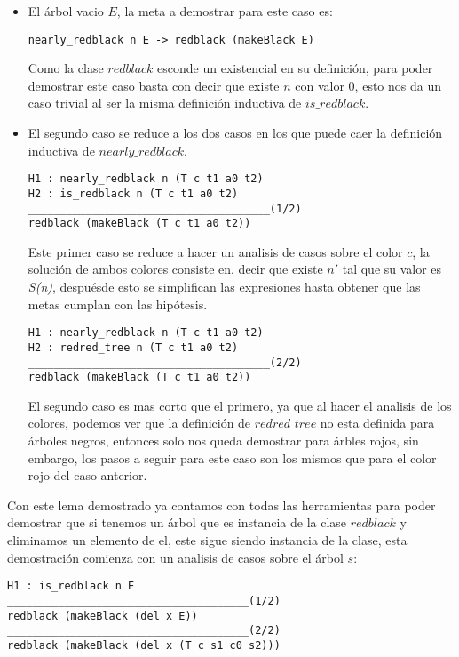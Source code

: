 \begin{itemize}
  \item El \'arbol vacio $E$, la meta a demostrar para este caso es:
\begin{verbatim}
nearly_redblack n E -> redblack (makeBlack E)
\end{verbatim}
        Como la clase $redblack$ esconde un existencial en su definici\'on, para poder demostrar
        este caso basta con decir que existe $n$ con valor 0, esto nos da un caso trivial al ser la
        misma definici\'on inductiva de $is\_redblack$.
  \item El segundo caso se reduce a los dos casos en los que puede caer la definici\'on inductiva
  de $nearly\_redblack$.
\begin{verbatim}
H1 : nearly_redblack n (T c t1 a0 t2)
H2 : is_redblack n (T c t1 a0 t2)
______________________________________(1/2)
redblack (makeBlack (T c t1 a0 t2))
\end{verbatim}
        Este primer caso se reduce a hacer un analisis de casos sobre el color $c$, la soluci\'on
        de ambos colores consiste en, decir que existe $n'$ tal que su valor es \textit{S(n)},
        despuésde esto se simplifican las expresiones hasta obtener que las metas cumplan con las
        hip\'otesis.
\begin{verbatim}
H1 : nearly_redblack n (T c t1 a0 t2)
H2 : redred_tree n (T c t1 a0 t2)
______________________________________(2/2)
redblack (makeBlack (T c t1 a0 t2))
\end{verbatim}
        El segundo caso es mas corto que el primero, ya que al hacer el analisis de los colores,
        podemos ver que la definición de $redred\_tree$ no esta definida para \'arboles negros,
        entonces solo nos queda demostrar para \'arbles rojos, sin embargo, los pasos a seguir para
        este caso son los mismos que para el color rojo del caso anterior.
\end{itemize}

Con este lema demostrado ya contamos con todas las herramientas para poder demostrar que si tenemos
un \'arbol que es instancia de la clase $redblack$ y eliminamos un elemento de el, este sigue
siendo instancia de la clase, esta demostraci\'on comienza con un analisis de casos sobre el
\'arbol $s$:

\begin{verbatim}
H1 : is_redblack n E
______________________________________(1/2)
redblack (makeBlack (del x E))
______________________________________(2/2)
redblack (makeBlack (del x (T c s1 c0 s2)))
\end{verbatim}

